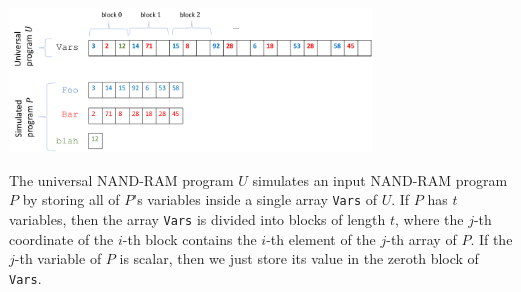 \begin{marginfigure}
\centering
\includegraphics[width=\linewidth, height=1.5in, keepaspectratio]{../figure/universalrammachine.png}
\caption{The universal NAND-RAM program \(U\) simulates an input
NAND-RAM program \(P\) by storing all of \(P\)'s variables inside a
single array \texttt{Vars} of \(U\). If \(P\) has \(t\) variables, then
the array \texttt{Vars} is divided into blocks of length \(t\), where
the \(j\)-th coordinate of the \(i\)-th block contains the \(i\)-th
element of the \(j\)-th array of \(P\). If the \(j\)-th variable of
\(P\) is scalar, then we just store its value in the zeroth block of
\texttt{Vars}.}
\label{universalrammachinefig}
\end{marginfigure}

